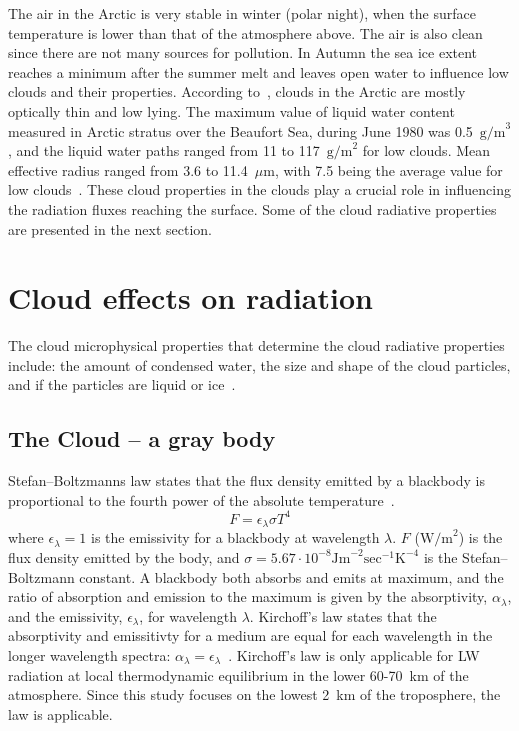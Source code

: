 The air in the Arctic is very stable in winter (polar night), when the surface temperature is lower than that of the atmosphere above. The air is also clean since there are not many sources for pollution. In Autumn the sea ice extent reaches a minimum after the summer melt and leaves open water to influence low clouds and their properties. According to~\citet{Curry1996}, clouds in the Arctic are mostly optically thin and low lying. The maximum value of liquid water content measured in Arctic stratus over the Beaufort Sea, during June 1980 was 0.5~$\text{g/m}^3$, and the liquid water paths ranged from 11 to 117~$\text{g/m}^2$ for low clouds. Mean effective radius ranged from 3.6 to 11.4~$\mu\text{m}$, with 7.5 being the average value for low clouds~\citep{Curry1996}. These cloud properties in the clouds play a crucial role in influencing the radiation fluxes reaching the surface. Some of the cloud radiative properties are presented in the next section.

\section{Cloud effects on radiation}
The cloud microphysical properties that determine the cloud radiative properties include: the amount of condensed water, the size and shape of the cloud particles, and if the particles are liquid or ice~\citep{Curry1996}.

\subsection{The Cloud -- a gray body}
Stefan–Boltzmanns law states that the flux density emitted by a blackbody is proportional to the fourth power of the absolute temperature~\citep{Liou2002}. 
\begin{equation}
F = \epsilon_{\lambda} \sigma T^4
\label{eqn:stefanboltzmann}
\end{equation}
where $\epsilon_{\lambda} = 1$ is the emissivity for a blackbody at wavelength $\lambda$. $F$ ($\text{W/m}^2$) is the flux density emitted  by the body, and $\sigma = 5.67\cdot 10^{-8} \text{Jm}^{-2}\text{sec}^{-1}\text{K}^{-4}$ is the Stefan–Boltzmann constant. A blackbody both absorbs and emits at maximum, and the ratio of absorption and emission to the maximum is given by the absorptivity, $\alpha_{\lambda}$, and the emissivity, $\epsilon_{\lambda}$, for wavelength $\lambda$. Kirchoff's law states that the absorptivity and emissitivty for a medium are equal for each wavelength in the longer wavelength spectra: $\alpha_{\lambda} = \epsilon_{\lambda}$~\citep{Liou2002}. Kirchoff's law is only applicable for LW radiation at local thermodynamic equilibrium in the lower 60-70~km of the atmosphere. Since this study focuses on the lowest 2~km of the troposphere, the law is applicable.

